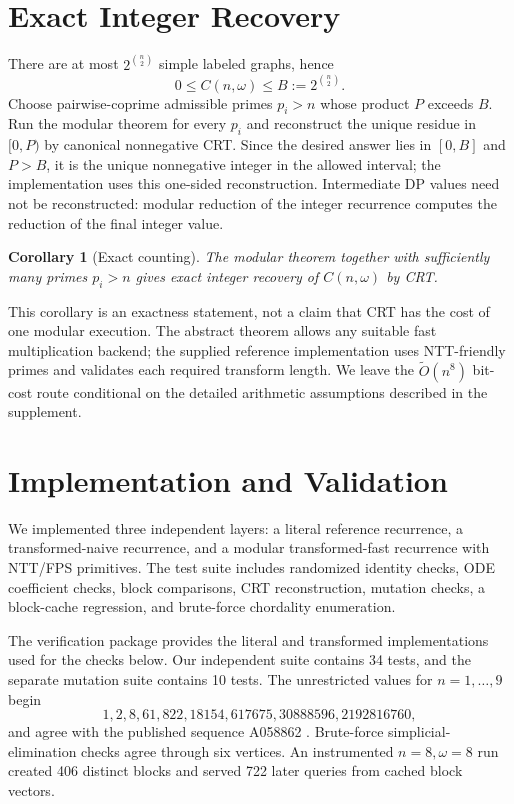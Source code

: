 \documentclass[10pt]{article}
\newtheorem{corollary}[theorem]{Corollary}
\begin{document}
\section{Exact Integer Recovery}
There are at most $2^{\binom n2}$ simple labeled graphs, hence
\[
0\le C(n,\omega)\le B:=2^{\binom n2}.
\]
Choose pairwise-coprime admissible primes $p_i>n$ whose product $P$ exceeds $B$. Run the modular theorem for every $p_i$ and reconstruct the unique residue in $[0,P)$ by canonical nonnegative CRT. Since the desired answer lies in $[0,B]$ and $P>B$, it is the unique nonnegative integer in the allowed interval; the implementation uses this one-sided reconstruction. Intermediate DP values need not be reconstructed: modular reduction of the integer recurrence computes the reduction of the final integer value.

\begin{corollary}[Exact counting]
The modular theorem together with sufficiently many primes $p_i>n$ gives exact integer recovery of $C(n,\omega)$ by CRT.
\end{corollary}

This corollary is an exactness statement, not a claim that CRT has the cost of one modular execution. The abstract theorem allows any suitable fast multiplication backend; the supplied reference implementation uses NTT-friendly primes and validates each required transform length. We leave the $\tilde O(n^8)$ bit-cost route conditional on the detailed arithmetic assumptions described in the supplement.

\section{Implementation and Validation}
We implemented three independent layers: a literal reference recurrence, a transformed-naive recurrence, and a modular transformed-fast recurrence with NTT/FPS primitives. The test suite includes randomized identity checks, ODE coefficient checks, block comparisons, CRT reconstruction, mutation checks, a block-cache regression, and brute-force chordality enumeration.

The verification package provides the literal and transformed implementations used for the checks below. Our independent suite contains 34 tests, and the separate mutation suite contains 10 tests. The unrestricted values for $n=1,\ldots,9$ begin
\[
1,2,8,61,822,18154,617675,30888596,2192816760,
\]
and agree with the published sequence A058862 \cite{oeis}. Brute-force simplicial-elimination checks agree through six vertices. An instrumented $n=8,\omega=8$ run created 406 distinct blocks and served 722 later queries from cached block vectors.
\end{document}
